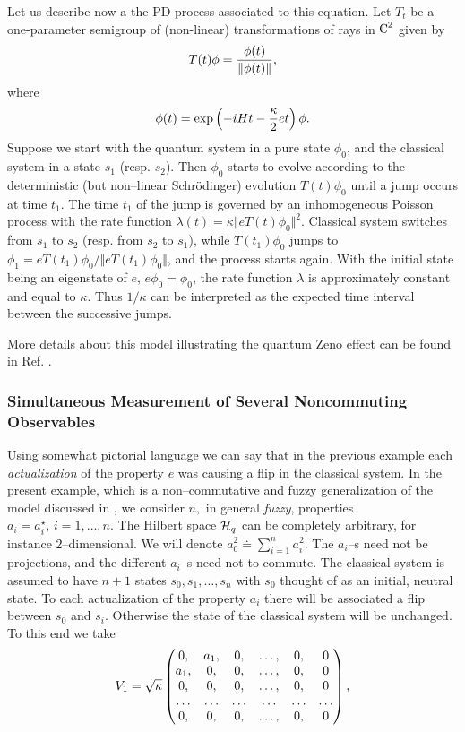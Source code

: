 \documentclass[12pt]{article}
\def\complex{{\kern .1em {\raise .47ex \hbox
{$\scriptscriptstyle
|$}}
\kern -.4em {\rm C}}}
\def\be{\begin{equation}} \def\ee{\end{equation}}
\begin{document}
Let us describe now a the PD process associated to this equation. 
Let
$T_t$ be a one-parameter semigroup of  (non-linear) transformations of
rays in
$\complex^2$ given by
\be T (t)\phi  ={\phi  (t) \over \Vert \phi  (t) \Vert}, 
\ee where
\be
\phi  (t)=\exp\left ({-iHt-{\kappa\over 2}et}\right)
\phi . 
\ee    Suppose we start with the quantum system in a pure state
$\phi_0$,  and  the classical system in a state
$s_1$  (resp.  $s_2$).  Then $\phi_0$ starts to evolve according to the
deterministic  (but non--linear Schr\"odinger) evolution $T (t)\phi_0 $ until a
jump occurs at time $t_1$.  The time $t_1$ of the jump is governed by
an inhomogeneous Poisson process with the rate function
$\lambda  (t) = \kappa \Vert e T (t)\phi_0 \Vert^2$.  Classical system
switches from $s_1$ to $s_2$  (resp.  from $s_2$ to $s_1$),  while  
$T (t_1)\phi_0$ jumps to
$\phi_1=eT (t_1)\phi_0/\Vert eT (t_1)\phi_0 \Vert$,  
and the process starts again.  With the initial
state being an eigenstate of $e$,  $e\phi_0=\phi_0$,  the rate
function $\lambda$ is approximately constant and equal to $\kappa$. 
Thus
${1/\kappa}$ can be interpreted as the expected time interval between
the successive jumps.

More details about this model illustrating the quantum Zeno effect
can be found in Ref.  \cite{bla2}. 
\subsubsection{Simultaneous Measurement of Several Noncommuting Observables}

Using somewhat pictorial language we can say that in the previous
example each {\em actualization} of the property
 $e$ was causing a flip in the classical system.  In the present
example,  which is a non--commutative and fuzzy generalization of the model 
discussed in \cite{bla1},  we
consider
$n , $   in general {\em fuzzy},  properties
$a_i=a_i^\star , \,  i=1, \ldots , n. $ 
The Hilbert space ${\cal H}_q$ can be completely arbitrary, 
for instance $2$--dimensional.    We will
denote
$a_0^2\doteq\sum_{i=1}^n a_i^2 . $ The 
$a_i$--s need not be projections,  and the different $a_i$--s 
need not to commute.   The classical system
is assumed to have
$n+1$ states
$s_0, s_1, \ldots , s_n$ with $s_0$ thought of as an initial,  
neutral state. 
  To
each actualization of the property $a_i$ there will be associated a
flip between
$s_0$ and
$s_i . $  Otherwise
the state of the classical system will be unchanged.  To this end we
take 
$$V_{1} ={\sqrt\kappa}
 \begin{pmatrix}0,     & a_{1} ,  &0 ,  &\ldots ,  &0 ,    
&0
\cr
                   a_{1}, & 0     ,  &0 ,  &\ldots ,  &0 ,     &0 \cr
                   0,    & 0     ,  &0 ,  &\ldots ,  &0 ,     &0\cr
\ldots&\ldots   &\ldots&\ldots &\ldots&\ldots\cr
                   0    , & 0     ,  &0 ,  &\ldots ,  &0 ,    &0\end{pmatrix} , $$
\end{document}
